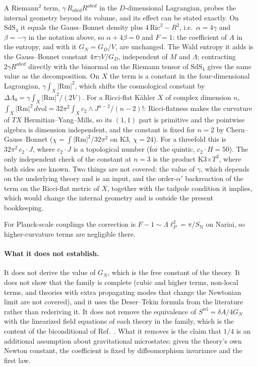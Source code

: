 \documentclass[11pt]{article}
\newcommand{\Srel}{S^{\mathrm{rel}}}
\begin{document}
A Riemann$^2$ term, $\gamma\,R_{abcd}R^{abcd}$ in the $D$-dimensional Lagrangian, probes the internal geometry beyond its volume, and its effect can be stated exactly. On $\mathrm{SdS}_4$ it equals the Gauss--Bonnet density plus $4\,\mathrm{Ric}^2-R^2$, i.e.\ $\alpha=4\gamma$ and $\beta=-\gamma$ in the notation above, so $\alpha+4\beta=0$ and $F=1$: the coefficient of $A$ in the entropy, and with it $G_N=G_D/V$, are unchanged. The Wald entropy it adds is the Gauss--Bonnet constant $4\pi\gamma V/G_D$, independent of $M$ and $\Lambda$; contracting $2\gamma R^{abcd}$ directly with the binormal on the Riemann tensor of $\mathrm{SdS}_4$ gives the same value as the decomposition. On $X$ the term is a constant in the four-dimensional Lagrangian, $\gamma\int_X|\mathrm{Rm}|^2$, which shifts the cosmological constant by $\Delta\Lambda_0=\gamma\int_X|\mathrm{Rm}|^2/(2V)$. For a Ricci-flat K\"ahler $X$ of complex dimension $n$, $\int_X|\mathrm{Rm}|^2\,d\mathrm{vol}=32\pi^2\int_X c_2\wedge J^{n-2}/(n-2)!$: Ricci-flatness makes the curvature of $TX$ Hermitian--Yang--Mills, so its $(1,1)$ part is primitive and the pointwise algebra is dimension independent, and the constant is fixed for $n=2$ by Chern--Gauss--Bonnet ($\chi=\int|\mathrm{Rm}|^2/32\pi^2$ on K3, $\chi=24$). For a threefold this is $32\pi^2\,c_2\!\cdot\! J$, where $c_2\!\cdot\! J$ is a topological number (for the quintic, $c_2\!\cdot\! H=50$). The only independent check of the constant at $n=3$ is the product K3$\times T^2$, where both sides are known. Two things are not covered: the value of $\gamma$, which depends on the underlying theory and is an input, and the order-$\alpha'$ backreaction of the term on the Ricci-flat metric of $X$, together with the tadpole condition it implies, which would change the internal geometry and is outside the present bookkeeping.

For Planck-scale couplings the correction is $F-1\sim\Lambda\ell_P^2=\pi/S_{\mathrm N}$ on Nariai, so higher-curvature terms are negligible there.

\paragraph{What it does not establish.} It does not derive the value of $G_N$, which is the free constant of the theory. It does not show that the family is complete (cubic and higher terms, non-local terms, and theories with extra propagating modes that change the Newtonian limit are not covered), and it uses the Deser--Tekin formula from the literature rather than rederiving it. It does not remove the equivalence of $\Srel=\delta A/4G_N$ with the linearized field equations of each theory in the family, which is the content of the biconditional of Ref.~\cite{DorauMuch}. What it removes is the claim that $1/4$ is an additional assumption about gravitational microstates: given the theory's own Newton constant, the coefficient is fixed by diffeomorphism invariance and the first law.
\end{document}
